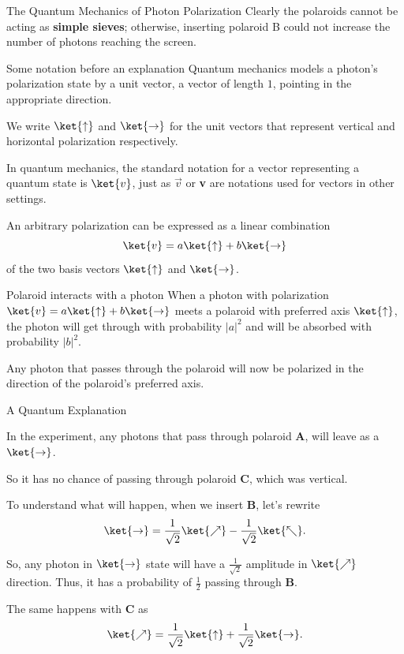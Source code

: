 \documentclass[10pt]{beamer}
\newcommand{\horiz}[0]{\ket{\rightarrow}}
\newcommand{\verti}[0]{\ket{\uparrow}}
\begin{document}
\begin{frame}[fragile]{The Quantum Mechanics of Photon Polarization}
    Clearly the polaroids cannot be acting as \textbf{simple sieves}; otherwise, inserting polaroid B could not increase the number of photons reaching the screen.
\end{frame}

\begin{frame}[fragile]{Some notation before an explanation}
        Quantum mechanics models a photon’s polarization state by a unit vector, a vector of length $1$, pointing in the appropriate direction.
        
        We write $\verti$ and $\horiz$ for the unit vectors that represent vertical and horizontal polarization respectively.
        
        In quantum mechanics, the standard notation for a vector representing a quantum state is $\ket{v}$, just as $\vec{v}$ or \textbf{v} are notations used for vectors in other settings.
        
        An arbitrary polarization can be expressed as a linear combination $$\ket{v} = a\verti + b\horiz$$ of the two basis vectors $\verti$ and $\horiz$.
\end{frame}

\begin{frame}[fragile]{Polaroid interacts with a photon}
    When a photon with polarization $\ket{v} = a\verti + b\horiz$ meets a polaroid with preferred axis $\verti$, the photon will get through with probability $|a|^2$ and will be absorbed with probability $|b|^2$.

    Any photon that passes through the polaroid will now be polarized in the direction of the polaroid’s preferred axis. 
    
\end{frame}

\begin{frame}[fragile]{A Quantum Explanation}


        In the experiment, any photons that pass through polaroid \textbf{A}, will leave as a $\horiz$. 
        
        So it has no chance of passing through polaroid \textbf{C}, which was vertical.
        
        To understand what will happen, when we insert \textbf{B}, let's rewrite 
        $$\horiz = \frac{1}{\sqrt{2}} \ket{\nearrow} - \frac{1}{\sqrt{2}} \ket{\nwarrow}.$$
        
        So, any photon in $\horiz$ state will have a $\frac{1}{\sqrt{2}}$ amplitude in $\ket{\nearrow}$ direction. Thus, it has a probability of $\frac{1}{2}$ passing through \textbf{B}.
        
        The same happens with \textbf{C} as
        $$\ket{\nearrow} = \frac{1}{\sqrt{2}} \verti + \frac{1}{\sqrt{2}} \horiz.$$
\end{frame}
\end{document}
